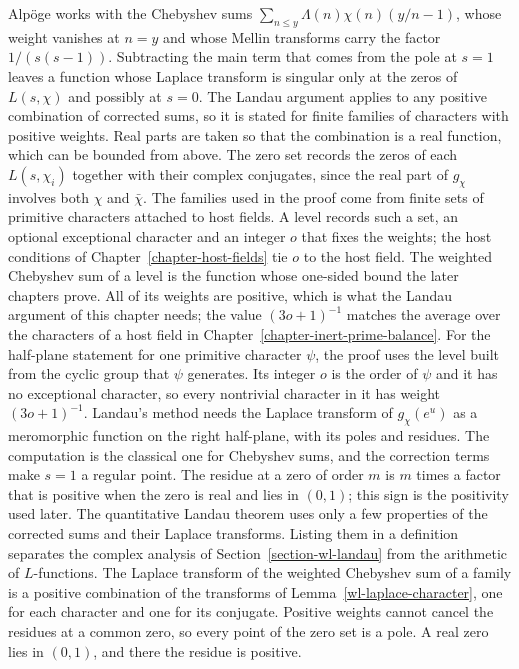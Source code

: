 Alpöge works with the Chebyshev sums $\sum_{n\leq y}\Lambda(n)\chi(n)(y/n-1)$, whose weight vanishes at $n=y$ and whose Mellin transforms carry the factor $1/(s(s-1))$. Subtracting the main term that comes from the pole at $s=1$ leaves a function whose Laplace transform is singular only at the zeros of $L(s,\chi)$ and possibly at $s=0$.
The Landau argument applies to any positive combination of corrected sums, so it is stated for finite families of characters with positive weights. Real parts are taken so that the combination is a real function, which can be bounded from above. The zero set records the zeros of each $L(s,\chi_i)$ together with their complex conjugates, since the real part of $g_\chi$ involves both $\chi$ and $\bar\chi$.
The families used in the proof come from finite sets of primitive characters attached to host fields. A level records such a set, an optional exceptional character and an integer $o$ that fixes the weights; the host conditions of Chapter~\ref{chapter-host-fields} tie $o$ to the host field.
The weighted Chebyshev sum of a level is the function whose one-sided bound the later chapters prove. All of its weights are positive, which is what the Landau argument of this chapter needs; the value $(3o+1)^{-1}$ matches the average over the characters of a host field in Chapter~\ref{chapter-inert-prime-balance}.
For the half-plane statement for one primitive character $\psi$, the proof uses the level built from the cyclic group that $\psi$ generates. Its integer $o$ is the order of $\psi$ and it has no exceptional character, so every nontrivial character in it has weight $(3o+1)^{-1}$.
Landau's method needs the Laplace transform of $g_\chi(e^u)$ as a meromorphic function on the right half-plane, with its poles and residues. The computation is the classical one for Chebyshev sums, and the correction terms make $s=1$ a regular point. The residue at a zero of order $m$ is $m$ times a factor that is positive when the zero is real and lies in $(0,1)$; this sign is the positivity used later.
The quantitative Landau theorem uses only a few properties of the corrected sums and their Laplace transforms. Listing them in a definition separates the complex analysis of Section~\ref{section-wl-landau} from the arithmetic of $L$-functions.
The Laplace transform of the weighted Chebyshev sum of a family is a positive combination of the transforms of Lemma~\ref{wl-laplace-character}, one for each character and one for its conjugate. Positive weights cannot cancel the residues at a common zero, so every point of the zero set is a pole. A real zero lies in $(0,1)$, and there the residue is positive.
